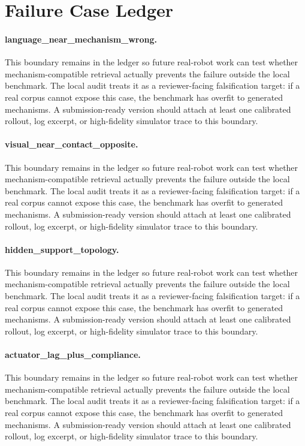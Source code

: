 \documentclass{article}
\begin{document}
\section{Failure Case Ledger}
\paragraph{language\_near\_mechanism\_wrong.} This boundary remains in the ledger so future real-robot work can test whether mechanism-compatible retrieval actually prevents the failure outside the local benchmark. The local audit treats it as a reviewer-facing falsification target: if a real corpus cannot expose this case, the benchmark has overfit to generated mechanisms. A submission-ready version should attach at least one calibrated rollout, log excerpt, or high-fidelity simulator trace to this boundary.
\paragraph{visual\_near\_contact\_opposite.} This boundary remains in the ledger so future real-robot work can test whether mechanism-compatible retrieval actually prevents the failure outside the local benchmark. The local audit treats it as a reviewer-facing falsification target: if a real corpus cannot expose this case, the benchmark has overfit to generated mechanisms. A submission-ready version should attach at least one calibrated rollout, log excerpt, or high-fidelity simulator trace to this boundary.
\paragraph{hidden\_support\_topology.} This boundary remains in the ledger so future real-robot work can test whether mechanism-compatible retrieval actually prevents the failure outside the local benchmark. The local audit treats it as a reviewer-facing falsification target: if a real corpus cannot expose this case, the benchmark has overfit to generated mechanisms. A submission-ready version should attach at least one calibrated rollout, log excerpt, or high-fidelity simulator trace to this boundary.
\paragraph{actuator\_lag\_plus\_compliance.} This boundary remains in the ledger so future real-robot work can test whether mechanism-compatible retrieval actually prevents the failure outside the local benchmark. The local audit treats it as a reviewer-facing falsification target: if a real corpus cannot expose this case, the benchmark has overfit to generated mechanisms. A submission-ready version should attach at least one calibrated rollout, log excerpt, or high-fidelity simulator trace to this boundary.
\end{document}
